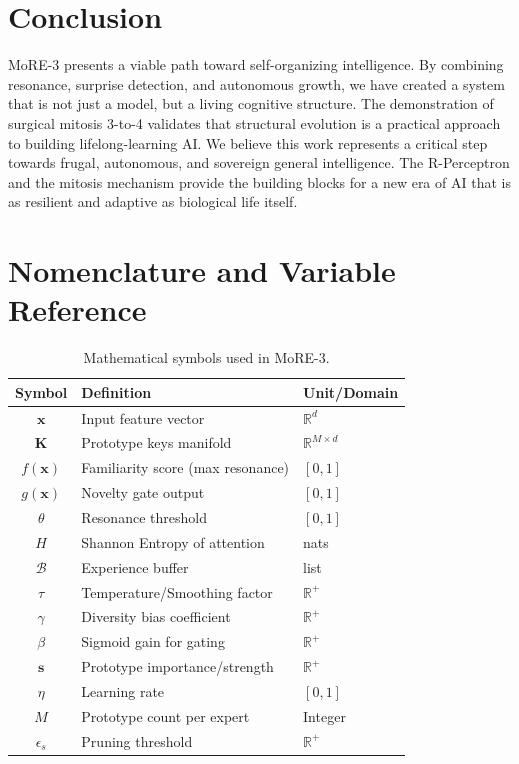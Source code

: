 \documentclass[11pt,hidelinks]{article}
\begin{document}
\section{Conclusion}
MoRE-3 presents a viable path toward self-organizing intelligence. By combining resonance, surprise detection, and autonomous growth, we have created a system that is not just a model, but a living cognitive structure. The demonstration of surgical mitosis 3-to-4 validates that structural evolution is a practical approach to building lifelong-learning AI. We believe this work represents a critical step towards frugal, autonomous, and sovereign general intelligence. The R-Perceptron and the mitosis mechanism provide the building blocks for a new era of AI that is as resilient and adaptive as biological life itself.

\newpage
\appendix
\section{Nomenclature and Variable Reference}
\begin{table}[h]
\centering
\caption{Mathematical symbols used in MoRE-3.}
\begin{tabular}{cll}
\toprule
Symbol & Definition & Unit/Domain \\
\midrule
$\mathbf{x}$ & Input feature vector & $\mathbb{R}^d$ \\
$\mathbf{K}$ & Prototype keys manifold & $\mathbb{R}^{M \times d}$ \\
$f(\mathbf{x})$ & Familiarity score (max resonance) & $[0, 1]$ \\
$g(\mathbf{x})$ & Novelty gate output & $[0, 1]$ \\
$\theta$ & Resonance threshold & $[0, 1]$ \\
$H$ & Shannon Entropy of attention & nats \\
$\mathcal{B}$ & Experience buffer & list \\
$\tau$ & Temperature/Smoothing factor & $\mathbb{R}^+$ \\
$\gamma$ & Diversity bias coefficient & $\mathbb{R}^+$ \\
$\beta$ & Sigmoid gain for gating & $\mathbb{R}^+$ \\
$\mathbf{s}$ & Prototype importance/strength & $\mathbb{R}^+$ \\
$\eta$ & Learning rate & $[0, 1]$ \\
$M$ & Prototype count per expert & Integer \\
$\epsilon_s$ & Pruning threshold & $\mathbb{R}^+$ \\
\bottomrule
\end{tabular}
\end{table}
\end{document}
